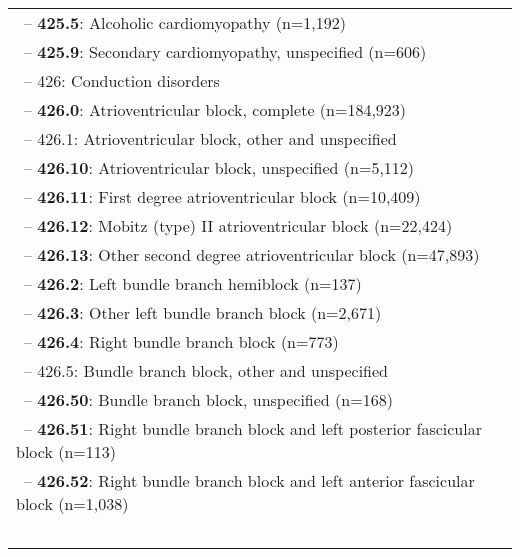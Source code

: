 \begin{longtable}{p{\textwidth}}
\\ \-\ \hspace{30pt}\footnotesize{-- {\color{ForestGreen} \textbf{425.5}}: Alcoholic cardiomyopathy (n=1,192)} \\ \-\ \hspace{30pt}\footnotesize{-- {\color{ForestGreen} \textbf{425.9}}: Secondary cardiomyopathy, unspecified (n=606)} \\ \-\ \hspace{20pt}\footnotesize{-- 426: Conduction disorders} \\ \-\ \hspace{30pt}\footnotesize{-- {\color{ForestGreen} \textbf{426.0}}: Atrioventricular block, complete (n=184,923)} \\ \-\ \hspace{30pt}\footnotesize{-- 426.1: Atrioventricular block, other and unspecified} \\ \-\ \hspace{40pt}\footnotesize{-- {\color{ForestGreen} \textbf{426.10}}: Atrioventricular block, unspecified (n=5,112)} \\ \-\ \hspace{40pt}\footnotesize{-- {\color{ForestGreen} \textbf{426.11}}: First degree atrioventricular block (n=10,409)} \\ \-\ \hspace{40pt}\footnotesize{-- {\color{ForestGreen} \textbf{426.12}}: Mobitz (type) II atrioventricular block (n=22,424)} \\ \-\ \hspace{40pt}\footnotesize{-- {\color{ForestGreen} \textbf{426.13}}: Other second degree atrioventricular block (n=47,893)} \\ \-\ \hspace{30pt}\footnotesize{-- {\color{ForestGreen} \textbf{426.2}}: Left bundle branch hemiblock (n=137)} \\ \-\ \hspace{30pt}\footnotesize{-- {\color{ForestGreen} \textbf{426.3}}: Other left bundle branch block (n=2,671)} \\ \-\ \hspace{30pt}\footnotesize{-- {\color{ForestGreen} \textbf{426.4}}: Right bundle branch block (n=773)} \\ \-\ \hspace{30pt}\footnotesize{-- 426.5: Bundle branch block, other and unspecified} \\ \-\ \hspace{40pt}\footnotesize{-- {\color{ForestGreen} \textbf{426.50}}: Bundle branch block, unspecified (n=168)} \\ \-\ \hspace{40pt}\footnotesize{-- {\color{ForestGreen} \textbf{426.51}}: Right bundle branch block and left posterior fascicular block (n=113)} \\ \-\ \hspace{40pt}\footnotesize{-- {\color{ForestGreen} \textbf{426.52}}: Right bundle branch block and left anterior fascicular block (n=1,038)} \\ \-\ 
\end{longtable}
